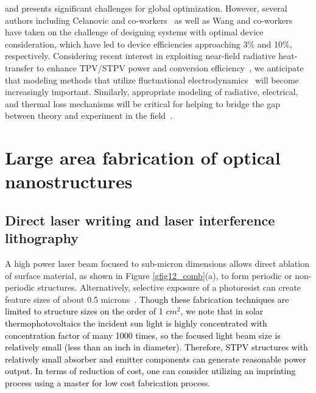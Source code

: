 \documentclass[review]{elsarticle}
\begin{document}
and presents significant challenges for global optimization.  
However, several authors including Celanovic and co-workers~\cite{g4}
as well as Wang and co-workers~\cite{g9} have taken on the challenge of designing systems with optimal device consideration, which have led to device efficiencies approaching 3\% and 
10\%, respectively. Considering recent interest in exploiting near-field radiative heat-transfer to enhance
TPV/STPV power and conversion efficiency~\cite{NearFieldConcentrated,SZF_NatNano_2016, KJ_SciRep_2016}, we anticipate that modeling methods that utilize
fluctuational electrodynamics~\cite{rodriguez2011,datas2013,didari2014,didari2015,edalatpour2014} will become increasingly important.
Similarly, appropriate modeling of radiative, electrical, and thermal loss mechanisms will be critical for helping to bridge
the gap between theory and experiment in the field~\cite{BDB_SciRep_2015}.
  
\section{Large area fabrication of optical nanostructures}
\subsection{Direct laser writing and laser interference lithography}
A high power laser beam focused to sub-micron dimensions allows direct 
ablation of surface material,  as shown in Figure \ref{gfig12_comb}(a), to form periodic or non-periodic structures.   Alternatively, selective exposure of a 
photoresist can create feature sizes of about 0.5 microns~\cite{g29}. 
\textcolor{black}{Though these fabrication techniques are limited to structure sizes on 
the order of 1 $cm^2$, we note that in solar thermophotovoltaics
the incident sun light is highly concentrated with concentration factor of 
many 1000 times, so the focused light beam size is relatively small (less 
than an inch in diameter).  Therefore, STPV structures with relatively small
absorber and emitter components can generate reasonable power output. 
In terms of reduction of cost, one can consider utilizing an imprinting 
process using a master for low cost fabrication process.}
\end{document}
